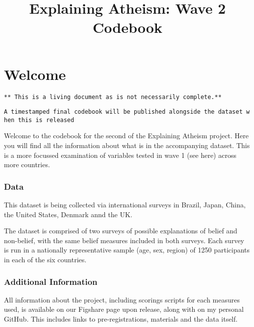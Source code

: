\documentclass[
  letterpaper,
]{scrbook}
\title{Explaining Atheism: Wave 2 Codebook}
\author{}
\date{}
\renewcommand*\contentsname{Table of contents}
\newcommand\contentsname{Table of contents}
\begin{document}
\frontmatter
\maketitle

\renewcommand*\contentsname{Table of contents}
{
\setcounter{tocdepth}{2}
\tableofcontents
}
\mainmatter
{}

\chapter*{Welcome}\label{welcome}


\texttt{**\ This\ is\ a\ living\ document\ as\ is\ not\ necessarily\ complete.**}

\texttt{A\ timestamped\ final\ codebook\ will\ be\ published\ alongside\ the\ dataset\ when\ this\ is\ released}

Welcome to the codebook for the second of the Explaining Atheism
project. Here you will find all the information about what is in the
accompanying dataset. This is a more focussed examination of variables
tested in wave 1 (see here) across more countries.

\subsection*{Data}\label{data}

This dataset is being collected via international surveys in Brazil,
Japan, China, the United States, Denmark annd the UK.

The dataset is comprised of two surveys of possible explanations of
belief and non-belief, with the same belief measures included in both
surveys. Each survey is run in a nationally representative sample (age,
sex, region) of 1250 participants in each of the six countries.

\subsection*{Additional Information}\label{additional-information}

All information about the project, including scorings scripts for each
measures used, is available on our Figshare page upon release, along
with on my personal GitHub. This includes links to pre-registrations,
materials and the data itself.
\end{document}
